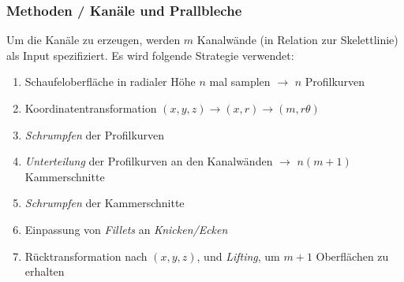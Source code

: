 \documentclass[8pt, aspectratio=169]{beamer}
\begin{document}
\begin{frame}
	\frametitle{Methoden / Kanäle und Prallbleche}
	\vspace{-1cm}\hspace{-0.5cm}
	\begin{minipage}[t]{\textwidth}
		Um die Kanäle zu erzeugen, werden $m$ Kanalwände (in Relation zur Skelettlinie) als Input spezifiziert.
		Es wird folgende Strategie verwendet:
		\begin{enumerate}
			\item Schaufeloberfläche in radialer Höhe $n$ mal samplen $\rightarrow$ $n$ Profilkurven
			\item Koordinatentransformation $(x, y, z) \rightarrow (x, r) \rightarrow (m, r\theta)$
			\item \emph{Schrumpfen} der Profilkurven
			\item \emph{Unterteilung} der Profilkurven an den Kanalwänden $\rightarrow$ $n(m+1)$ Kammerschnitte 
			\item \emph{Schrumpfen} der Kammerschnitte
			\item Einpassung von \emph{Fillets} an \emph{Knicken/Ecken}
			\item Rücktransformation nach $(x, y, z)$, und \emph{Lifting}, um $m+1$ Oberflächen zu erhalten
		\end{enumerate}
	\end{minipage}
	\vfill
\end{frame}
\end{document}
